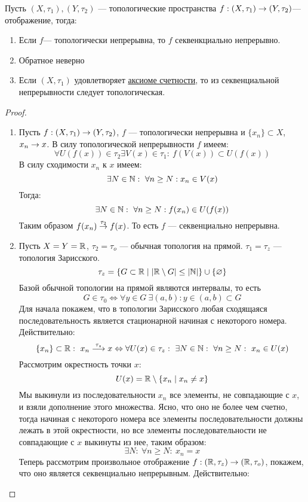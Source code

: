 \begin{claim}
	Пусть $(X, \tau_1), (Y, \tau_2)$ --- топологические пространства $f: (X,\tau_1) \rightarrow (Y, \tau_2)$--- отображение, тогда:
	\begin{enumerate}
		\item Если $f$--- топологически непрерывна, то $f$ секвенкциально непрерывно.
		\item Обратное неверно
		\item Если $(X, \tau_1)$ удовлетворяет \hyperlink{fcs}{аксиоме счетности}, то из секвенциальной непрерывности следует топологическая.
	\end{enumerate}
\end{claim}
\begin{proof}
\hfill 
\begin{enumerate}
	\item 
	Пусть $f: (X, \tau_1) \rightarrow (Y, \tau_2)$, $f$ --- топологически непрерывна и $\{x_n\} \subset X$, $x_n \rightarrow x$. В силу топологической непрерывности $f$ имеем:
	$$
	\forall U(f(x)) \in \tau_2 \exists V(x) \in \tau_1: \ f(V(x)) \subset U(f(x))
	$$
	В силу сходимости $x_n$ к $x$ имеем:
	$$
	\exists N \in \mathbb{N}: \ \forall n \geq N: x_n \in V(x)
	$$
	Тогда:
	$$
	\exists N \in \mathbb{N}: \ \forall n \geq N: f(x_n) \in U(f(x))
	$$
	Таким образом $f(x_n) \stackrel{\tau_2}{\rightarrow} f(x)$. То есть $f$ --- секвенциально непрерывна.
	\item Пусть $X = Y = \mathbb{R}$, $\tau_2 = \tau_o$ --- обычная топология на прямой. $\tau_1 = \tau_z$ --- топология Зарисского. 
	$$
	\tau_z = \{G \subset \mathbb{R} \mid |\mathbb{R} \setminus G | \leq |\mathbb{N}| \}\cup \{\varnothing\} 
	$$
	Базой обычной топологии на прямой являются интервалы, то есть 
	$$
	G \in \tau_0  \Leftrightarrow \forall y \in G \ \exists (a,b): y \in (a,b) \subset G
	$$ 
	Для начала покажем, что в топологии Зарисского любая сходящаяся последовательность является стационарной начиная с некоторого номера. Действительно: 
	$$
	\{x_n\} \subset \mathbb{R}: \ x_n \stackrel{\tau_z}{\longrightarrow} x \Leftrightarrow \forall U(x) \in \tau_z :\  \exists N \in \mathbb{N}: \ \forall n \geq N: \ x_n \in U(x)
	$$
	Рассмотрим окрестность точки $x$: 
	$$
	U(x) = \mathbb{R} \setminus \{x_n \mid x_n \neq x\}
	$$ 
	Мы выкинули из последовательности $x_n$ все элементы, не совпадающие с $x$, и взяли дополнение этого множества. Ясно, что оно не более чем счетно, тогда начиная с некоторого номера все элементы последовательности должны лежать в этой окрестности, но все элементы последовательности не совпадающие с $x$ выкинуты из нее, таким образом:
	$$
	\exists N : \ \forall n \geq N :\ x_n = x
	$$
	Теперь рассмотрим произвольное отображение $f: (\mathbb{R}, \tau_z) \rightarrow (\mathbb{R}, \tau_o)$, покажем, что оно является секвенциально непрерывным. Действительно:

\end{enumerate}
\end{proof}
